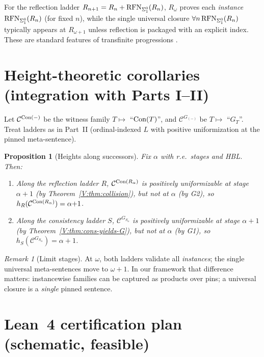 \documentclass[11pt]{article}
\newtheorem{proposition}[theorem]{Proposition}
\theoremstyle{definition}
\theoremstyle{remark}
\newtheorem{remark}[theorem]{Remark}
\begin{document}
For the reflection ladder \(R_{n+1}=R_n+\mathrm{RFN}_{\Sigma^0_1}(R_n)\), \(R_\omega\) proves each \emph{instance}
\(\mathrm{RFN}_{\Sigma^0_1}(R_n)\) (for fixed \(n\)), while the single universal closure
\(\forall n\,\mathrm{RFN}_{\Sigma^0_1}(R_n)\) typically appears at \(R_{\omega+1}\) unless reflection is packaged with an explicit index.
These are standard features of transfinite progressions \cite{Feferman1962,HajekPudlak}.

\section{Height-theoretic corollaries (integration with Parts I–II)}

Let \(\mathcal C^{\mathrm{Con}(-)}\) be the witness family \(T\mapsto\) “\(\mathrm{Con}(T)\)”, and \(\mathcal C^{G_{(-)}}\) be \(T\mapsto\) “\(G_T\)”.
Treat ladders as in Part~II (ordinal-indexed \(L\) with positive uniformization at the pinned meta-sentence).

\begin{proposition}[Heights along successors]
Fix \(\alpha\) with r.e.\ stages and HBL. Then:
\begin{enumerate}
\item Along the reflection ladder \(R\), \(\mathcal C^{\mathrm{Con}(R_\alpha)}\) is positively uniformizable at stage \(\alpha{+}1\) (by Theorem~\ref{V:thm:collision}), but not at \(\alpha\) (by G2), so \(h_R(\mathcal C^{\mathrm{Con}(R_\alpha)})=\alpha{+}1\).
\item Along the consistency ladder \(S\), \(\mathcal C^{G_{S_\alpha}}\) is positively uniformizable at stage \(\alpha{+}1\) (by Theorem~\ref{V:thm:cons-yields-G}), but not at \(\alpha\) (by G1), so \(h_S(\mathcal C^{G_{S_\alpha}})=\alpha{+}1\).
\end{enumerate}
\end{proposition}

\begin{remark}[Limit stages]
At \(\omega\), both ladders validate all \emph{instances}; the single universal meta-sentences move to \(\omega{+}1\).
In our framework that difference matters: instancewise families can be captured as products over pins;
a universal closure is a \emph{single} pinned sentence.
\end{remark}

\section{Lean~4 certification plan (schematic, feasible)}
\end{document}
